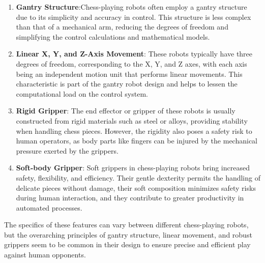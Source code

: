 \documentclass[10pt, a4paper, twocolumn]{article}
\begin{document}
\begin{enumerate}
    \item \textbf{Gantry Structure}:Chess-playing robots often employ a gantry structure due to its simplicity and accuracy in control. This structure is less complex than that of a mechanical arm, reducing the degrees of freedom and simplifying the control calculations and mathematical models.\cite{rao2023robot}
    
    \item \textbf{Linear X, Y, and Z-Axis Movement}: These robots typically have three degrees of freedom, corresponding to the X, Y, and Z axes, with each axis being an independent motion unit that performs linear movements. This characteristic is part of the gantry robot design and helps to lessen the computational load on the control system.\cite{du2013compliance}\cite{gupta2015autonomous}

    \item \textbf{Rigid Gripper}: The end effector or gripper of these robots is usually constructed from rigid materials such as steel or alloys, providing stability when handling chess pieces. However, the rigidity also poses a safety risk to human operators, as body parts like fingers can be injured by the mechanical pressure exerted by the grippers.

    \item \textbf{Soft-body Gripper}: Soft grippers in chess-playing robots bring increased safety, flexibility, and efficiency. Their gentle dexterity permits the handling of delicate pieces without damage, their soft composition minimizes safety risks during human interaction, and they contribute to greater productivity in automated processes\cite{terrile2021comparison, zaidi2021actuation}.
\end{enumerate}

The specifics of these features can vary between different chess-playing robots, but the overarching principles of gantry structure, linear movement, and robust grippers seem to be common in their design to ensure precise and efficient play against human opponents.
\end{document}
